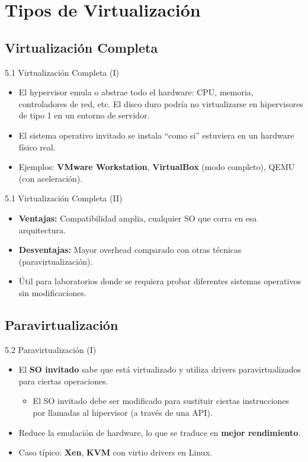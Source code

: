 \documentclass{beamer}
\begin{document}
\section{Tipos de Virtualización}

\subsection{Virtualización Completa}
\begin{frame}{5.1 Virtualización Completa (I)}
	\begin{itemize}
		\item El hypervisor emula o abstrae todo el hardware: CPU, memoria, controladores de red, etc. 
			\subitem El disco duro podría no virtualizarse en hipervisores de tipo 1 en un entorno de servidor.
		\item El sistema operativo invitado se instala “como si” estuviera en un hardware físico real.
		\item Ejemplos: \textbf{VMware Workstation}, \textbf{VirtualBox} (modo completo), QEMU (con aceleración).
	\end{itemize}
\end{frame}

\begin{frame}{5.1 Virtualización Completa (II)}
	\begin{itemize}
		\item \textbf{Ventajas:} Compatibilidad amplia, cualquier SO que corra en esa arquitectura.
		\item \textbf{Desventajas:} Mayor overhead comparado con otras técnicas (paravirtualización).
		\item Útil para laboratorios donde se requiera probar diferentes sistemas operativos sin modificaciones.
	\end{itemize}
\end{frame}

\subsection{Paravirtualización}
\begin{frame}{5.2 Paravirtualización (I)}
	\begin{itemize}
		\item El \textbf{SO invitado} sabe que está virtualizado y utiliza drivers paravirtualizados para ciertas operaciones. 
			\begin{itemize}
				\item El SO invitado debe ser modificado para sustituir ciertas instrucciones por llamadas al hipervisor (a través de una API).        
			\end{itemize}
		\item Reduce la emulación de hardware, lo que se traduce en \textbf{mejor rendimiento}.
		\item Caso típico: \textbf{Xen}, \textbf{KVM} con virtio drivers en Linux.
	\end{itemize}
\end{frame}
\end{document}
